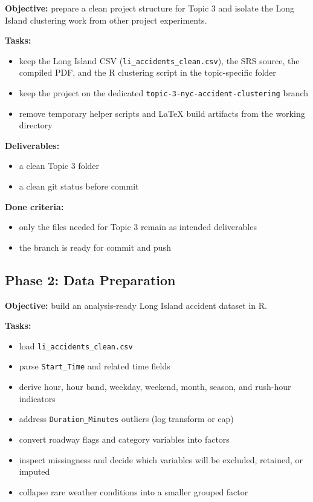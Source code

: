 \documentclass[11pt]{article}
\begin{document}
\textbf{Objective:} prepare a clean project structure for Topic 3 and isolate the Long Island clustering work from other project experiments.

\textbf{Tasks:}
\begin{itemize}
\item keep the Long Island CSV (\texttt{li\_accidents\_clean.csv}), the SRS source, the compiled PDF, and the R clustering script in the topic-specific folder
\item keep the project on the dedicated \texttt{topic-3-nyc-accident-clustering} branch
\item remove temporary helper scripts and LaTeX build artifacts from the working directory
\end{itemize}

\textbf{Deliverables:}
\begin{itemize}
\item a clean Topic 3 folder
\item a clean git status before commit
\end{itemize}

\textbf{Done criteria:}
\begin{itemize}
\item only the files needed for Topic 3 remain as intended deliverables
\item the branch is ready for commit and push
\end{itemize}

\subsection{Phase 2: Data Preparation}

\textbf{Objective:} build an analysis-ready Long Island accident dataset in R.

\textbf{Tasks:}
\begin{itemize}
\item load \texttt{li\_accidents\_clean.csv}
\item parse \texttt{Start\_Time} and related time fields
\item derive hour, hour band, weekday, weekend, month, season, and rush-hour indicators
\item address \texttt{Duration\_Minutes} outliers (log transform or cap)
\item convert roadway flags and category variables into factors
\item inspect missingness and decide which variables will be excluded, retained, or imputed
\item collapse rare weather conditions into a smaller grouped factor
\end{itemize}
\end{document}
